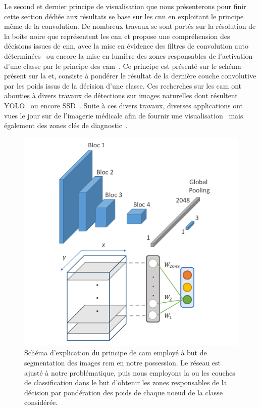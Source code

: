 Le second et dernier principe de visualisation que nous présenterons pour finir cette section dédiée aux résultats se base sur les \gls{cnn} en exploitant le principe même de la convolution. De nombreux travaux se sont portés sur la résolution de la boîte noire que représentent les \gls{cnn} et propose une compréhension des décisions issues de \gls{cnn}, avec la mise en évidence des filtres de convolution auto déterminées~\cite{Zeiler2014} ou encore la mise en lumière des zones responsables de l'activation d'une classe par le principe des \gls{cam}~\cite{Zhou2015}. Ce principe est présenté sur le schéma présent sur la  et, consiste à pondérer le résultat de la dernière couche convolutive par les poids issus de la décision d'une classe. Ces recherches sur les \gls{cam} ont abouties à divers travaux de détections sur images naturelles dont résultent YOLO~\cite{Redmon2016} ou encore SSD~\cite{Liu2016}. Suite à ces divers travaux, diverses applications ont vues le jour sur de l'imagerie médicale afin de fournir une visualisation~\cite{jia2017} mais également des zones clés de diagnostic~\cite{Park2019}.\par 

\begin{figure}[H]
    \centering
    \includegraphics[width=\linewidth]{contents/chapter_5/resources/scheme_image_improvement_cam.pdf}
    \caption{Schéma d'explication du principe de \gls{cam} employé à but de segmentation des images \gls{rcm} en notre possession. Le réseau est ajusté à notre problématique, puis nous employons la ou les couches de classification dans le but d'obtenir les zones responsables de la décision par pondération des poids de chaque noeud de la classe considérée.}
    \label{fig:scheme_image_improvement_cam}
\end{figure}\par


